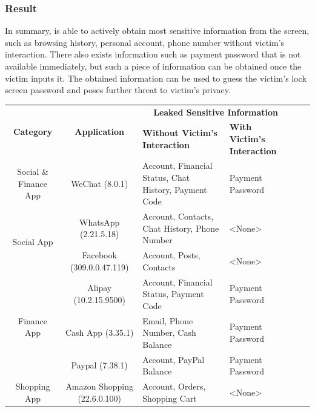 \subsubsection{Result}
In summary, \tool is able to actively obtain most sensitive information from the screen, such as browsing history, personal account, phone number without victim's interaction. There also exists information such as payment password that is not available immediately, but such a piece of information can be obtained once the victim inputs it. The obtained information can be used to guess the victim's lock screen password and poses further threat to victim's privacy.
\begin{table}[t]
	\centering
	\begin{tabular}{|c|c|l|l|c|c|}
		\hline
		\multirow{2}{*}{\textbf{Category} } & \multirow{2}{*}{ \textbf{Application} } & \multicolumn{2}{c|}{\textbf{Leaked Sensitive Information}} \\
															\cline{3-4}
											&				& \textbf{Without Victim's Interaction}						& \textbf{With Victim's Interaction} \\
		\hline
		Social \& Finance App 				& WeChat (8.0.1)      & Account, Financial Status, Chat History, Payment Code   		& Payment Password \\
		\hline
		\multirow{2}{*}{Social App}
							       			& WhatsApp (2.21.5.18)    & Account, Contacts, Chat History, Phone Number    & <None> \\
											\cline{2-4}
							       			& Facebook (309.0.0.47.119)   & Account, Posts, Contacts           & <None> \\
		\hline
		\multirow{3}{*}{Finance App}       	& Alipay (10.2.15.9500)      & Account, Financial Status, Payment Code         				& Payment Password \\
											\cline{2-4}
											& Cash App (3.35.1)   & Email, Phone Number, Cash Balance							& Payment Password \\
											\cline{2-4}
											& Paypal (7.38.1)      & Account, PayPal Balance     								& Payment Password \\
		\hline
		\multirow{1}{*}{Shopping App}		& Amazon Shopping (22.6.0.100)  & Account, Orders, Shopping Cart         				& <None> \\

\end{tabular}
\end{table}
